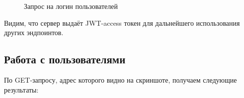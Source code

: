 \documentclass[coursework]{SCWorks}
\begin{document}
\begin{figure}[H]
	\caption{Запрос на логин пользователей}
	\label{pic5}
\end{figure}

Видим, что сервер выдаёт JWT-access токен для дальнейшего использования других
эндпоинтов.

\subsection{Работа с пользователями}

По GET-запросу, адрес которого видно на скриншоте, получаем следующие 
результаты:
\end{document}
